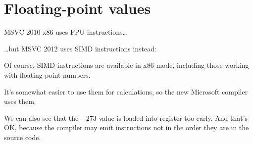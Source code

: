 \section{Floating-point values}



MSVC 2010 x86 uses \ac{FPU} instructions\dots



\dots but MSVC  2012 uses \ac{SIMD} instructions instead:



Of course, \ac{SIMD} instructions are available in x86 mode, 
including those working with floating point numbers.

It's somewhat easier to use them for calculations, so the new Microsoft compiler uses them.

We can also see that the $-273$ value 
is loaded into  register too early.
And that's OK, because the compiler may emit instructions not in 
the order they are in the source code.
